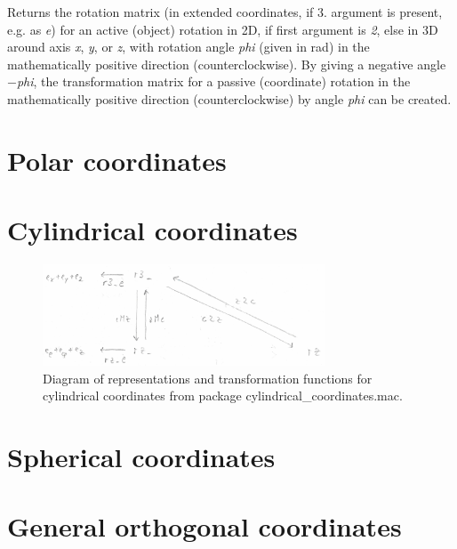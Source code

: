 \documentclass[../Maxima_Workbook.tex]{subfiles}
\begin{document}
\lz Returns the rotation matrix (in extended coordinates, if 3. argument is present, e.g. as \emph{e}) for an active (object) rotation in 2D, if first argument is \emph{2}, else in 3D around axis \emph{x}, \emph{y}, or \emph{z}, with rotation angle \emph{phi} (given in rad) in the mathematically positive direction (counterclockwise). By giving a negative angle $ - $\emph{phi}, the transformation matrix for a passive (coordinate) rotation in the mathematically positive direction (counterclockwise) by angle \emph{phi} can be created.

\section{Polar coordinates}

\section{Cylindrical coordinates}

\begin{figure}
	\centering
	\includegraphics[width=0.75\textwidth]{CS-Fig1.jpg}
	\caption{Diagram of representations and transformation functions for cylindrical coordinates from package cylindrical\_coordinates.mac.}
	\label{CS-Fig1}
\end{figure}

\section{Spherical coordinates}

\section{General orthogonal coordinates}
\end{document}
